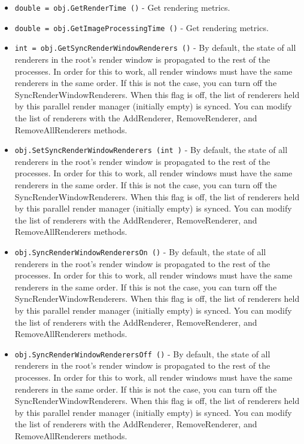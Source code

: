 \begin{itemize}
\item  \verb|double = obj.GetRenderTime ()| -  Get rendering metrics.

\item  \verb|double = obj.GetImageProcessingTime ()| -  Get rendering metrics.

\item  \verb|int = obj.GetSyncRenderWindowRenderers ()| -  By default, the state of all renderers in the root's render window is
 propagated to the rest of the processes.  In order for this to work, all
 render windows must have the same renderers in the same order.  If this is
 not the case, you can turn off the SyncRenderWindowRenderers.  When this
 flag is off, the list of renderers held by this parallel render manager
 (initially empty) is synced.  You can modify the list of renderers with the
 AddRenderer, RemoveRenderer, and RemoveAllRenderers methods.

\item  \verb|obj.SetSyncRenderWindowRenderers (int )| -  By default, the state of all renderers in the root's render window is
 propagated to the rest of the processes.  In order for this to work, all
 render windows must have the same renderers in the same order.  If this is
 not the case, you can turn off the SyncRenderWindowRenderers.  When this
 flag is off, the list of renderers held by this parallel render manager
 (initially empty) is synced.  You can modify the list of renderers with the
 AddRenderer, RemoveRenderer, and RemoveAllRenderers methods.

\item  \verb|obj.SyncRenderWindowRenderersOn ()| -  By default, the state of all renderers in the root's render window is
 propagated to the rest of the processes.  In order for this to work, all
 render windows must have the same renderers in the same order.  If this is
 not the case, you can turn off the SyncRenderWindowRenderers.  When this
 flag is off, the list of renderers held by this parallel render manager
 (initially empty) is synced.  You can modify the list of renderers with the
 AddRenderer, RemoveRenderer, and RemoveAllRenderers methods.

\item  \verb|obj.SyncRenderWindowRenderersOff ()| -  By default, the state of all renderers in the root's render window is
 propagated to the rest of the processes.  In order for this to work, all
 render windows must have the same renderers in the same order.  If this is
 not the case, you can turn off the SyncRenderWindowRenderers.  When this
 flag is off, the list of renderers held by this parallel render manager
 (initially empty) is synced.  You can modify the list of renderers with the
 AddRenderer, RemoveRenderer, and RemoveAllRenderers methods.


\end{itemize}
